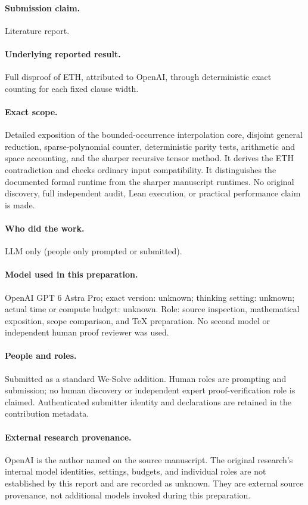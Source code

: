\documentclass[11pt,a4paper]{article}
\numberwithin{equation}{section}
\theoremstyle{definition}
\theoremstyle{remark}
\begin{document}
\paragraph{Submission claim.} Literature report.
\paragraph{Underlying reported result.} Full disproof of ETH, attributed to
OpenAI, through deterministic exact counting for each fixed clause width.
\paragraph{Exact scope.} Detailed exposition of the bounded-occurrence
interpolation core, disjoint general reduction, sparse-polynomial counter,
deterministic parity tests, arithmetic and space accounting, and the sharper
recursive tensor method. It derives the ETH contradiction and checks ordinary
input compatibility. It distinguishes the documented formal runtime from the
sharper manuscript runtimes. No original discovery, full independent audit,
Lean execution, or practical performance claim is made.
\paragraph{Who did the work.} LLM only (people only prompted or submitted).
\paragraph{Model used in this preparation.} OpenAI GPT 6 Astra Pro; exact version:
unknown; thinking setting: unknown; actual time or compute budget: unknown.
Role: source inspection, mathematical exposition, scope comparison, and TeX
preparation. No second model or independent human proof reviewer was used.
\paragraph{People and roles.} Submitted as a standard We-Solve addition. Human roles are prompting and submission; no human discovery or independent expert proof-verification role is claimed. Authenticated submitter identity and declarations are retained in the contribution metadata.
\paragraph{External research provenance.} OpenAI is the author named on the
source manuscript. The original research's internal model identities, settings,
budgets, and individual roles are not established by this report and are
recorded as unknown. They are external source provenance, not additional models
invoked during this preparation.
\end{document}
